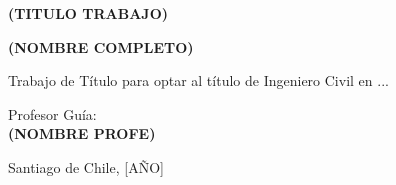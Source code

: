 
\thispagestyle{empty}

\vfill

\begin{coverbody}
  \begin{center}
    {\LARGE\textbf{(TITULO TRABAJO)}\par}

    \vspace{2cm}
    {\large\textbf{(NOMBRE COMPLETO)}\par}
  \end{center}
\end{coverbody}

\vfill

\begin{coverbody}
  Trabajo de Título para optar al título de Ingeniero Civil en ...

  \vspace{1cm}

  Profesor Guía:\\
  \textbf{(NOMBRE PROFE)}
\end{coverbody}

\vfill

\begin{coverbody}
  Santiago de Chile, [AÑO]
\end{coverbody}
\vspace{0.5cm}
\newpage
